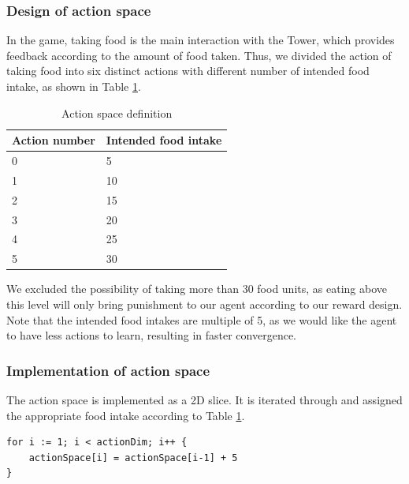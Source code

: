 \subsubsection{Design of action space}
In the game, taking food is the main interaction with the Tower, which provides feedback according to the amount of food taken. Thus, we divided the action of taking food into six distinct actions with different number of intended food intake, as shown in Table \ref{action-space}.
\begin{table}
\centering
\caption{Action space definition}
\label{action-space}
\begin{tabular}{@{}ll@{}}
\toprule
Action number & Intended food intake \\ \midrule
0             & 5                    \\
1             & 10                   \\
2             & 15                   \\
3             & 20                   \\
4             & 25                   \\
5             & 30                   \\ \bottomrule
\end{tabular}
\end{table}

We excluded the possibility of taking more than 30 food units, as eating above this level will only bring punishment to our agent according to our reward design. Note that the intended food intakes are multiple of 5, as we would like the agent to have less actions to learn, resulting in faster convergence. 
\subsubsection{Implementation of action space}
The action space is implemented as a 2D slice. It is iterated through and assigned the appropriate food intake according to Table \ref{action-space}.
\begin{lstlisting}
for i := 1; i < actionDim; i++ {
	actionSpace[i] = actionSpace[i-1] + 5
}
\end{lstlisting} 
